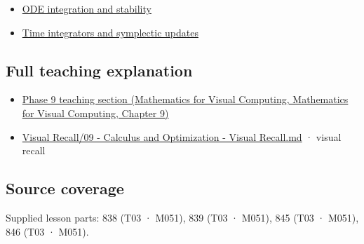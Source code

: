 \begin{itemize}
\tightlist
\item
  \hyperref[appendix-18eacf61a04b]{ODE integration and stability}
\item
  \hyperref[appendix-8f96f9c4d5bc]{Time integrators and symplectic updates}
\end{itemize}

\subsection{Full teaching explanation}\label{appendix-e8ab9836882e-full-teaching-explanation}

\begin{itemize}
\tightlist
\item
  \href{../02-Mathematics-for-Visual-Computing/main.pdf\#nameddest=02-foundations-ii-ch025-odes-and-numerical-simulation}{Phase 9 teaching section (Mathematics for Visual Computing, Mathematics for Visual Computing, Chapter 9)}
\item
  \hyperref[appendix-adf48f5dc5c1]{Visual Recall/09 - Calculus and Optimization - Visual Recall.md} · visual recall
\end{itemize}

\subsection{Source coverage}\label{appendix-e8ab9836882e-source-coverage}

Supplied lesson parts: 838 (T03 · M051), 839 (T03 · M051), 845 (T03 · M051), 846 (T03 · M051).
